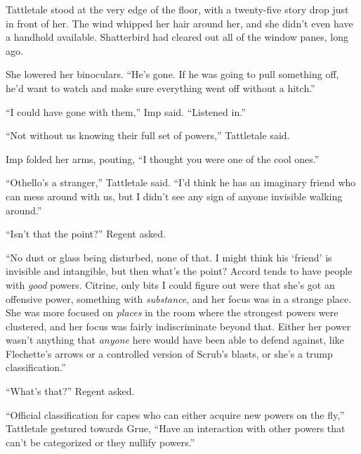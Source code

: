 





Tattletale stood at the very edge of the floor, with a twenty-five story drop just in front of her.  The wind whipped her hair around her, and she didn't even have a handhold available.  Shatterbird had cleared out all of the window panes, long ago.



She lowered her binoculars.  ``He's gone.  If he was going to pull something off, he'd want to watch and make sure everything went off without a hitch.''



``I could have gone with them,'' Imp said.  ``Listened in.''



``Not without us knowing their full set of powers,'' Tattletale said.



Imp folded her arms, pouting, ``I thought you were one of the cool ones.''



``Othello's a stranger,'' Tattletale said.  ``I'd think he has an imaginary friend who can mess around with us, but I didn't see any sign of anyone invisible walking around.''



``Isn't that the point?'' Regent asked.



``No dust or glass being disturbed, none of that.  I might think his `friend' is invisible and intangible, but then what's the point?  Accord tends to have people with \emph{good} powers.  Citrine, only bits I could figure out were that she's got an offensive power, something with \emph{substance}, and her focus was in a strange place.  She was more focused on \emph{places} in the room where the strongest powers were clustered, and her focus was fairly indiscriminate beyond that.  Either her power wasn't anything that \emph{anyone} here would have been able to defend against, like Flechette's arrows or a controlled version of Scrub's blasts, or she's a trump classification.''



``What's that?'' Regent asked.



``Official classification for capes who can either acquire new powers on the fly,'' Tattletale gestured towards Grue, ``Have an interaction with other powers that can't be categorized or they nullify powers.''



